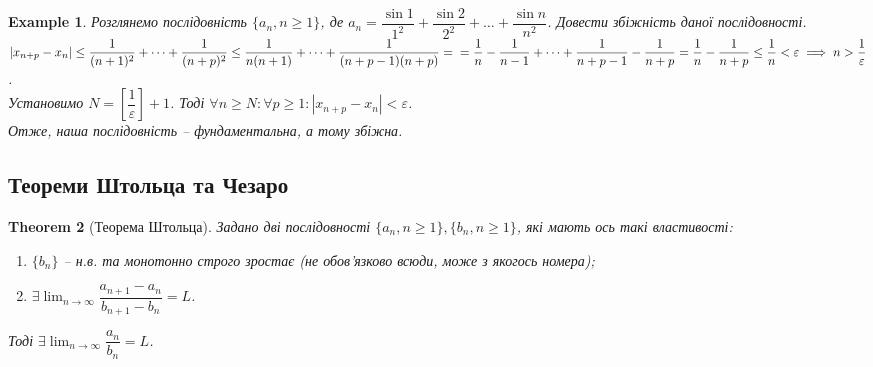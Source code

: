 \documentclass[a4paper, 14pt]{article}
\theoremstyle{theoremdd}
\newtheorem{theorem}{Theorem}[subsection]
\theoremstyle{theoremdd}
\theoremstyle{theoremdd}
\theoremstyle{theoremdd}
\newtheorem{example}[theorem]{Example}
\theoremstyle{theoremdd}
\theoremstyle{theoremdd}
\theoremstyle{theoremdd}
\theoremstyle{theoremdd}
\begin{document}
	\begin{example}
	Розглянемо послідовність $\{a_n, n \geq 1\}$, де $a_n = \dfrac{\sin 1}{1^2} + \dfrac{\sin 2}{2^2} + \dots + \dfrac{\sin n}{n^2}$. Довести збіжність даної послідовності.\\
	$|x_{n+p} - x_n| \leq \dfrac{1}{(n+1)^2} + \dots + \dfrac{1}{(n+p)^2} \leq \dfrac{1}{n(n+1)} + \dots + \dfrac{1}{(n+p-1)(n+p)} = \\ = \dfrac{1}{n} - \dfrac{1}{n-1} + \dots + \dfrac{1}{n+p-1} - \dfrac{1}{n+p} = \dfrac{1}{n} - \dfrac{1}{n+p} \leq \dfrac{1}{n} < \varepsilon \implies n > \dfrac{1}{\varepsilon}$.\\
	Установимо $N = \left[ \dfrac{1}{\varepsilon} \right] + 1$. Тоді $\forall n \geq N: \forall p \geq 1: |x_{n+p} - x_n| < \varepsilon$.\\
	Отже, наша послідовність -- фундаментальна, а тому збіжна.
	\end{example}
	
	\subsection{Теореми Штольца та Чезаро}
	\begin{theorem}[Теорема Штольца]
	Задано дві послідовності $\{a_n, n \geq 1\}, \{b_n, n \geq 1\}$, які мають ось такі властивості:
	\begin{enumerate}[nosep,wide=0pt,label={\arabic*)}]
	\item $\{b_n\}$ -- н.в. та монотонно строго зростає (не обов'язково всюди, може з якогось номера);
	\item $\exists \displaystyle \lim_{n \to \infty} \dfrac{a_{n+1} - a_n}{b_{n+1} - b_n} = L$.
	\end{enumerate}
	Тоді $\exists \displaystyle \lim_{n \to \infty} \dfrac{a_n}{b_n} = L$.
	\end{theorem}
	
\end{document}
